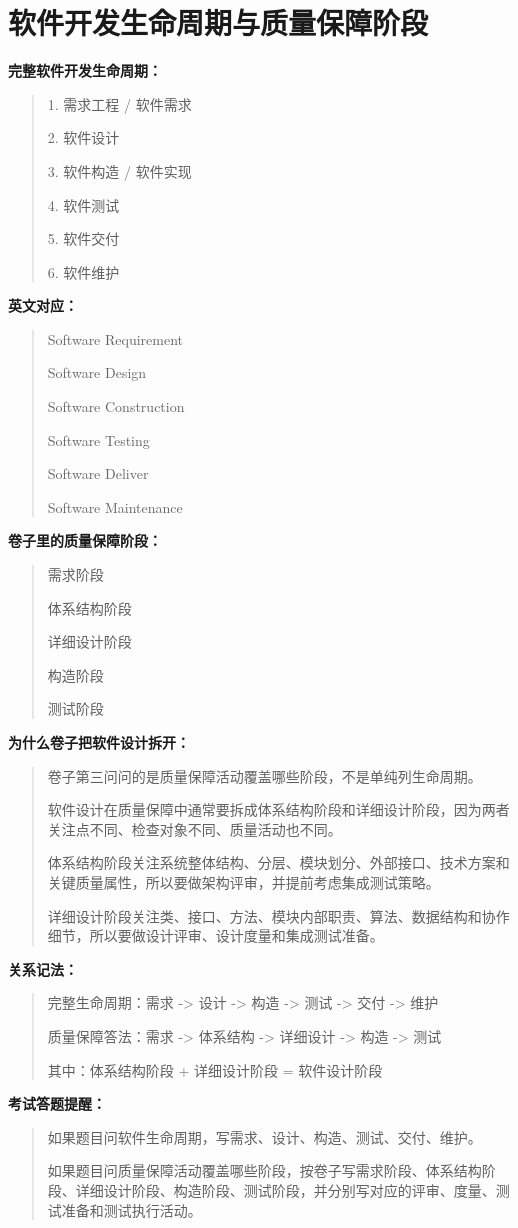 \documentclass[UTF8,zihao=-4]{ctexart}
\newcommand{\labeltext}[1]{%
  \textbf{#1}
}
\newenvironment{answerbox}{%
  \begin{quote}\small\color{TextGray}
}{%
  \end{quote}
}
\begin{document}
\clearpage
\section*{\color{TitleBlue}软件开发生命周期与质量保障阶段}

\labeltext{完整软件开发生命周期：}
\begin{answerbox}
1. 需求工程 / 软件需求

2. 软件设计

3. 软件构造 / 软件实现

4. 软件测试

5. 软件交付

6. 软件维护
\end{answerbox}

\labeltext{英文对应：}
\begin{answerbox}
Software Requirement

Software Design

Software Construction

Software Testing

Software Deliver

Software Maintenance
\end{answerbox}

\labeltext{卷子里的质量保障阶段：}
\begin{answerbox}
需求阶段

体系结构阶段

详细设计阶段

构造阶段

测试阶段
\end{answerbox}

\labeltext{为什么卷子把软件设计拆开：}
\begin{answerbox}
卷子第三问问的是质量保障活动覆盖哪些阶段，不是单纯列生命周期。

软件设计在质量保障中通常要拆成体系结构阶段和详细设计阶段，因为两者关注点不同、检查对象不同、质量活动也不同。

体系结构阶段关注系统整体结构、分层、模块划分、外部接口、技术方案和关键质量属性，所以要做架构评审，并提前考虑集成测试策略。

详细设计阶段关注类、接口、方法、模块内部职责、算法、数据结构和协作细节，所以要做设计评审、设计度量和集成测试准备。
\end{answerbox}

\labeltext{关系记法：}
\begin{answerbox}
完整生命周期：需求 -> 设计 -> 构造 -> 测试 -> 交付 -> 维护

质量保障答法：需求 -> 体系结构 -> 详细设计 -> 构造 -> 测试

其中：体系结构阶段 + 详细设计阶段 = 软件设计阶段
\end{answerbox}

\labeltext{考试答题提醒：}
\begin{answerbox}
如果题目问软件生命周期，写需求、设计、构造、测试、交付、维护。

如果题目问质量保障活动覆盖哪些阶段，按卷子写需求阶段、体系结构阶段、详细设计阶段、构造阶段、测试阶段，并分别写对应的评审、度量、测试准备和测试执行活动。
\end{answerbox}
\end{document}
